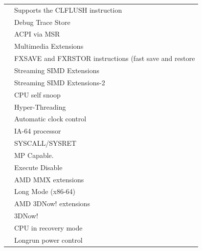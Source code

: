 \begin{longtable}{|ll|}
\hspace{0.5cm}{\tt CLFLSH} &  Supports the CLFLUSH instruction  \\
\hspace{0.5cm}{\tt DTES} &  Debug Trace Store  \\
\hspace{0.5cm}{\tt ACPI} &  ACPI via MSR  \\
\hspace{0.5cm}{\tt MMX} &  Multimedia Extensions  \\
\hspace{0.5cm}{\tt FXSR} &  FXSAVE and FXRSTOR instructions (fast save and restore  \\
\hspace{0.5cm}{\tt XMM} &  Streaming SIMD Extensions  \\
\hspace{0.5cm}{\tt XMM2} &  Streaming SIMD Extensions-2  \\
\hspace{0.5cm}{\tt SELFSNOOP} &  CPU self snoop  \\
\hspace{0.5cm}{\tt HT} &  Hyper-Threading  \\
\hspace{0.5cm}{\tt ACC} &  Automatic clock control  \\
\hspace{0.5cm}{\tt IA64} &  IA-64 processor  \\
\hspace{0.5cm}{\tt SYSCALL} &  SYSCALL/SYSRET  \\
\hspace{0.5cm}{\tt MP} &  MP Capable.  \\
\hspace{0.5cm}{\tt NX} &  Execute Disable  \\
\hspace{0.5cm}{\tt MMXEXT} &  AMD MMX extensions  \\
\hspace{0.5cm}{\tt LM} &  Long Mode (x86-64)  \\
\hspace{0.5cm}{\tt THREEDNOWEXT} &  AMD 3DNow! extensions  \\
\hspace{0.5cm}{\tt THREEDNOW} &  3DNow!  \\
\hspace{0.5cm}{\tt RECOVERY} &  CPU in recovery mode  \\
\hspace{0.5cm}{\tt LONGRUN} &  Longrun power control  \\

\end{longtable}
